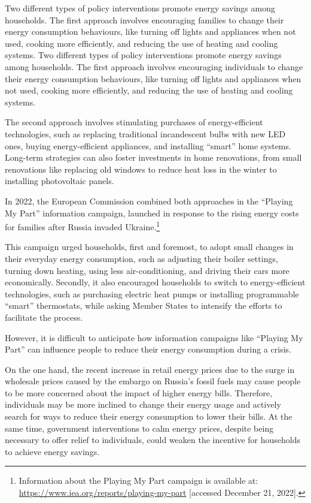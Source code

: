 \documentclass[
  11pt,
]{article}
\begin{document}
Two different types of policy interventions promote energy savings among
households. The first approach involves encouraging families to change
their energy consumption behaviours, like turning off lights and
appliances when not used, cooking more efficiently, and reducing the use
of heating and cooling systems. Two different types of policy
interventions promote energy savings among households. The first
approach involves encouraging individuals to change their energy
consumption behaviours, like turning off lights and appliances when not
used, cooking more efficiently, and reducing the use of heating and
cooling systems.

The second approach involves stimulating purchases of energy-efficient
technologies, such as replacing traditional incandescent bulbs with new
LED ones, buying energy-efficient appliances, and installing ``smart''
home systems. Long-term strategies can also foster investments in home
renovations, from small renovations like replacing old windows to reduce
heat loss in the winter to installing photovoltaic panels.

In 2022, the European Commission combined both approaches in the
``Playing My Part'' information campaign, launched in response to the
rising energy costs for families after Russia invaded
Ukraine.\footnote{Information about the Playing My Part campaign is
  available at: \url{https://www.iea.org/reports/playing-my-part}
  {[}accessed December 21, 2022{]}.}

This campaign urged households, first and foremost, to adopt small
changes in their everyday energy consumption, such as adjusting their
boiler settings, turning down heating, using less air-conditioning, and
driving their cars more economically. Secondly, it also encouraged
households to switch to energy-efficient technologies, such as
purchasing electric heat pumps or installing programmable ``smart''
thermostats, while asking Member States to intensify the efforts to
facilitate the process.

However, it is difficult to anticipate how information campaigns like
``Playing My Part'' can influence people to reduce their energy
consumption during a crisis.

On the one hand, the recent increase in retail energy prices due to the
surge in wholesale prices caused by the embargo on Russia's fossil fuels
may cause people to be more concerned about the impact of higher energy
bills. Therefore, individuals may be more inclined to change their
energy usage and actively search for ways to reduce their energy
consumption to lower their bills. At the same time, government
interventions to calm energy prices, despite being necessary to offer
relief to individuals, could weaken the incentive for households to
achieve energy savings.
\end{document}
